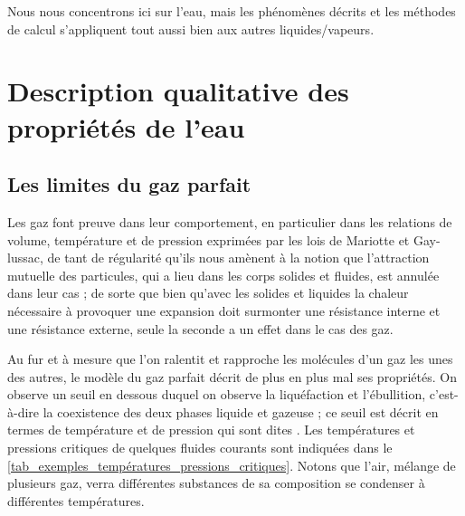 		Nous nous concentrons ici sur l’eau, mais les phénomènes décrits et les méthodes de calcul s’appliquent tout aussi bien aux autres liquides/vapeurs.



\section{Description qualitative des propriétés de l’eau}


	\subsection{Les limites du gaz parfait}

		Les gaz font preuve dans leur comportement, en particulier dans les relations de volume, température et de pression exprimées par les lois de Mariotte et Gay-lussac, de tant de régularité qu’ils nous amènent à la notion que l’attraction mutuelle des particules, qui a lieu dans les corps solides et fluides, est annulée dans leur cas ; de sorte que bien qu’avec les solides et liquides la chaleur nécessaire à provoquer une expansion doit surmonter une résistance interne et une résistance externe, seule la seconde a un effet dans le cas des gaz.
		
		Au fur et à mesure que l’on ralentit et rapproche les molécules d’un gaz les unes des autres, le modèle du gaz parfait décrit de plus en plus mal ses propriétés. On observe un seuil en dessous duquel on observe la liquéfaction et l’ébullition, c’est-à-dire la coexistence des deux phases liquide et gazeuse ; ce seuil est décrit en termes de température et de pression qui sont dites . Les températures et pressions critiques de quelques fluides courants sont indiquées dans le \cref{tab_exemples_températures_pressions_critiques}. Notons que l’air, mélange de plusieurs gaz, verra différentes substances de sa composition se condenser à différentes températures.

